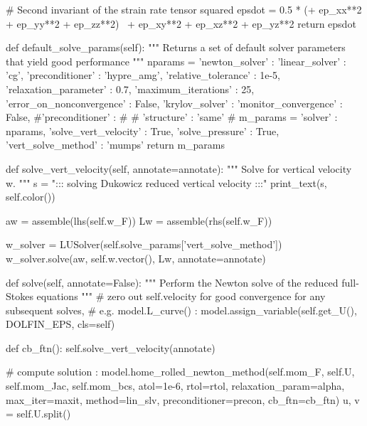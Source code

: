 \begin{python}[label=cslvr_reformulated_stokes, caption={\CSLVR source code contained in the \texttt{MomentumDukowiczStokesReduced} class.}]
  # Second invariant of the strain rate tensor squared
  epsdot = 0.5 * (+ ep_xx**2 + ep_yy**2 + ep_zz**2) \
                  + ep_xy**2 + ep_xz**2 + ep_yz**2
  return epsdot

def default_solve_params(self):
  """ 
  Returns a set of default solver parameters that yield good performance
  """
  nparams = {'newton_solver' :
            {
              'linear_solver'            : 'cg',
              'preconditioner'           : 'hypre_amg',
              'relative_tolerance'       : 1e-5,
              'relaxation_parameter'     : 0.7,
              'maximum_iterations'       : 25,
              'error_on_nonconvergence'  : False,
              'krylov_solver'            :
              {
                'monitor_convergence'   : False,
                #'preconditioner' :
                #{
                #  'structure' : 'same'
                #}
              }
            }}
  m_params  = {'solver'               : nparams,
               'solve_vert_velocity'  : True,
               'solve_pressure'       : True,
               'vert_solve_method'    : 'mumps'}
  return m_params

def solve_vert_velocity(self, annotate=annotate):
  """ 
  Solve for vertical velocity w.
  """
  s    = "::: solving Dukowicz reduced vertical velocity :::"
  print_text(s, self.color())
  
  aw       = assemble(lhs(self.w_F))
  Lw       = assemble(rhs(self.w_F))
  
  w_solver = LUSolver(self.solve_params['vert_solve_method'])
  w_solver.solve(aw, self.w.vector(), Lw, annotate=annotate)

def solve(self, annotate=False):
  """ 
  Perform the Newton solve of the reduced full-Stokes equations 
  """
  # zero out self.velocity for good convergence for any subsequent solves,
  # e.g. model.L_curve() :
  model.assign_variable(self.get_U(), DOLFIN_EPS, cls=self)

  def cb_ftn():
    self.solve_vert_velocity(annotate)
  
  # compute solution :
  model.home_rolled_newton_method(self.mom_F, self.U, self.mom_Jac, 
                                  self.mom_bcs, atol=1e-6, rtol=rtol,
                                  relaxation_param=alpha, max_iter=maxit,
                                  method=lin_slv, preconditioner=precon,
                                  cb_ftn=cb_ftn)
  u, v = self.U.split()
\end{python}



